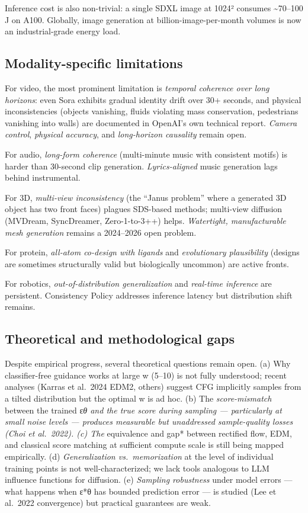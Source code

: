 \documentclass{article}
\begin{document}
Inference cost is also non-trivial: a single SDXL image at 1024² consumes \textasciitilde70--100 J on A100. Globally, image generation at billion-image-per-month volumes is now an industrial-grade energy load.

\subsection{Modality-specific limitations}\label{modality-specific-limitations}

For video, the most prominent limitation is \emph{temporal coherence over long horizons}: even Sora exhibits gradual identity drift over 30+ seconds, and physical inconsistencies (objects vanishing, fluids violating mass conservation, pedestrians vanishing into walls) are documented in OpenAI's own technical report. \emph{Camera control}, \emph{physical accuracy}, and \emph{long-horizon causality} remain open.

For audio, \emph{long-form coherence} (multi-minute music with consistent motifs) is harder than 30-second clip generation. \emph{Lyrics-aligned} music generation lags behind instrumental.

For 3D, \emph{multi-view inconsistency} (the ``Janus problem'' where a generated 3D object has two front faces) plagues SDS-based methods; multi-view diffusion (MVDream, SyncDreamer, Zero-1-to-3++) helps. \emph{Watertight, manufacturable mesh generation} remains a 2024--2026 open problem.

For protein, \emph{all-atom co-design with ligands} and \emph{evolutionary plausibility} (designs are sometimes structurally valid but biologically uncommon) are active fronts.

For robotics, \emph{out-of-distribution generalization} and \emph{real-time inference} are persistent. Consistency Policy addresses inference latency but distribution shift remains.

\subsection{Theoretical and methodological gaps}\label{theoretical-and-methodological-gaps}

Despite empirical progress, several theoretical questions remain open. (a) Why classifier-free guidance works at large w (5--10) is not fully understood; recent analyses (Karras et al.~2024 EDM2, others) suggest CFG implicitly samples from a tilted distribution but the optimal w is ad hoc. (b) The \emph{score-mismatch} between the trained ε\emph{θ and the true score during sampling --- particularly at small noise levels --- produces measurable but unaddressed sample-quality losses (Choi et al.~2022). (c) The }equivalence and gap* between rectified flow, EDM, and classical score matching at sufficient compute scale is still being mapped empirically. (d) \emph{Generalization vs.~memorization} at the level of individual training points is not well-characterized; we lack tools analogous to LLM influence functions for diffusion. (e) \emph{Sampling robustness} under model errors --- what happens when ε*θ has bounded prediction error --- is studied (Lee et al.~2022 convergence) but practical guarantees are weak.
\end{document}
